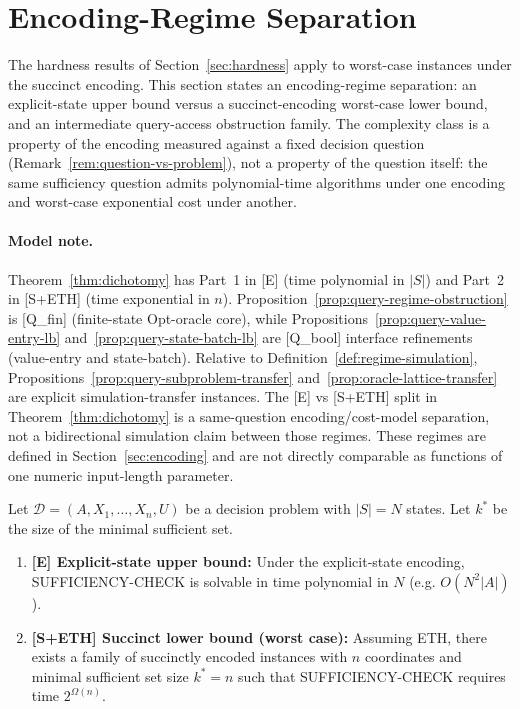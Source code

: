 \section{Encoding-Regime Separation}\label{sec:dichotomy}

The hardness results of Section~\ref{sec:hardness} apply to worst-case instances under the succinct encoding. This section states an encoding-regime separation: an explicit-state upper bound versus a succinct-encoding worst-case lower bound, and an intermediate query-access obstruction family. The complexity class is a property of the encoding measured against a fixed decision question (Remark~\ref{rem:question-vs-problem}), not a property of the question itself: the same sufficiency question admits polynomial-time algorithms under one encoding and worst-case exponential cost under another.

\paragraph{Model note.} Theorem~\ref{thm:dichotomy} has Part~1 in [E] (time polynomial in $|S|$) and Part~2 in [S+ETH] (time exponential in $n$). Proposition~\ref{prop:query-regime-obstruction} is [Q\_fin] (finite-state Opt-oracle core), while Propositions~\ref{prop:query-value-entry-lb} and~\ref{prop:query-state-batch-lb} are [Q\_bool] interface refinements (value-entry and state-batch). Relative to Definition~\ref{def:regime-simulation}, Propositions~\ref{prop:query-subproblem-transfer} and~\ref{prop:oracle-lattice-transfer} are explicit simulation-transfer instances. The [E] vs [S+ETH] split in Theorem~\ref{thm:dichotomy} is a same-question encoding/cost-model separation, not a bidirectional simulation claim between those regimes. These regimes are defined in Section~\ref{sec:encoding} and are not directly comparable as functions of one numeric input-length parameter.

\begin{theorem}\label{thm:dichotomy}
Let $\mathcal{D} = (A, X_1, \ldots, X_n, U)$ be a decision problem with $|S| = N$ states. Let $k^*$ be the size of the minimal sufficient set.

\begin{enumerate}
\item \textbf{[E] Explicit-state upper bound:} Under the explicit-state encoding, SUFFICIENCY-CHECK is solvable in time polynomial in $N$ (e.g. $O(N^2|A|)$).

\item \textbf{[S+ETH] Succinct lower bound (worst case):} Assuming ETH, there exists a family of succinctly encoded instances with $n$ coordinates and minimal sufficient set size $k^* = n$ such that SUFFICIENCY-CHECK requires time $2^{\Omega(n)}$.
\end{enumerate}
\end{theorem}

